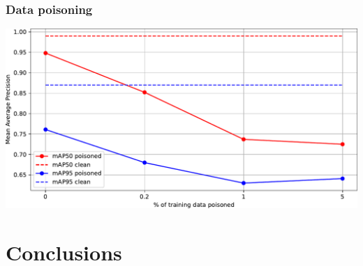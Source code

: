 \documentclass[14pt,a4paper]{extarticle}
\newcounter{e}
\numberwithin{equation}{section}
\numberwithin{figure}{section}
\begin{document}
    \subsubsection{Data poisoning}
\begin{center}
    \includegraphics[width=14cm]{images/robustness.pdf}
\end{center}

\newpage
\thispagestyle{empty}
\section{Conclusions}
\end{document}
